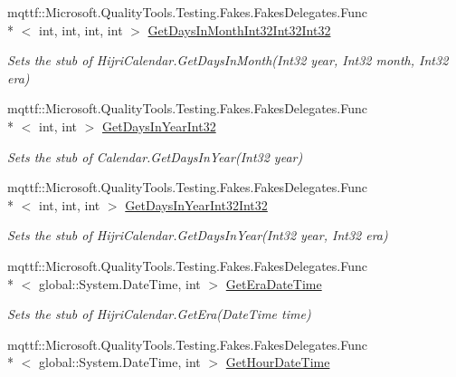 \begin{DoxyCompactItemize}
mqttf\-::\-Microsoft.\-Quality\-Tools.\-Testing.\-Fakes.\-Fakes\-Delegates.\-Func\\*
$<$ int, int, int, int $>$ \hyperlink{class_system_1_1_globalization_1_1_fakes_1_1_stub_hijri_calendar_a30338167a5833f60329027ad683edbe1}{Get\-Days\-In\-Month\-Int32\-Int32\-Int32}
\begin{DoxyCompactList}\small\item\em Sets the stub of Hijri\-Calendar.\-Get\-Days\-In\-Month(\-Int32 year, Int32 month, Int32 era)\end{DoxyCompactList}\item 
mqttf\-::\-Microsoft.\-Quality\-Tools.\-Testing.\-Fakes.\-Fakes\-Delegates.\-Func\\*
$<$ int, int $>$ \hyperlink{class_system_1_1_globalization_1_1_fakes_1_1_stub_hijri_calendar_aed636b5e61d7162d3f5ca409d023d33e}{Get\-Days\-In\-Year\-Int32}
\begin{DoxyCompactList}\small\item\em Sets the stub of Calendar.\-Get\-Days\-In\-Year(\-Int32 year)\end{DoxyCompactList}\item 
mqttf\-::\-Microsoft.\-Quality\-Tools.\-Testing.\-Fakes.\-Fakes\-Delegates.\-Func\\*
$<$ int, int, int $>$ \hyperlink{class_system_1_1_globalization_1_1_fakes_1_1_stub_hijri_calendar_a0eedfe389452d8f4df6955cb44898678}{Get\-Days\-In\-Year\-Int32\-Int32}
\begin{DoxyCompactList}\small\item\em Sets the stub of Hijri\-Calendar.\-Get\-Days\-In\-Year(\-Int32 year, Int32 era)\end{DoxyCompactList}\item 
mqttf\-::\-Microsoft.\-Quality\-Tools.\-Testing.\-Fakes.\-Fakes\-Delegates.\-Func\\*
$<$ global\-::\-System.\-Date\-Time, int $>$ \hyperlink{class_system_1_1_globalization_1_1_fakes_1_1_stub_hijri_calendar_ab91115c1bf5588aaf49b240c07b10f12}{Get\-Era\-Date\-Time}
\begin{DoxyCompactList}\small\item\em Sets the stub of Hijri\-Calendar.\-Get\-Era(\-Date\-Time time)\end{DoxyCompactList}\item 
mqttf\-::\-Microsoft.\-Quality\-Tools.\-Testing.\-Fakes.\-Fakes\-Delegates.\-Func\\*
$<$ global\-::\-System.\-Date\-Time, int $>$ \hyperlink{class_system_1_1_globalization_1_1_fakes_1_1_stub_hijri_calendar_a142ced7fe42069c812f3f6bc0b73ac21}{Get\-Hour\-Date\-Time}

\end{DoxyCompactItemize}
